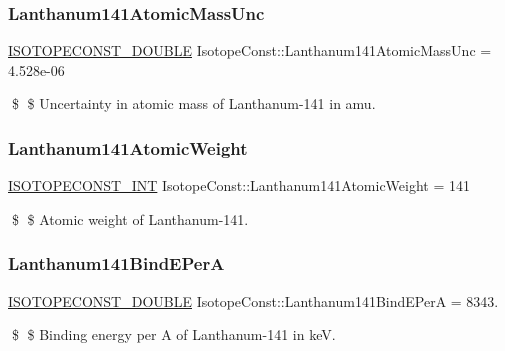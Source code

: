 \subsubsection{\texorpdfstring{Lanthanum141\+Atomic\+Mass\+Unc}{Lanthanum141AtomicMassUnc}}
{\footnotesize\ttfamily \mbox{\hyperlink{group___isotope_const-_macros_ga8f45a7272ce02c0b4c65c44636ed719a}{I\+S\+O\+T\+O\+P\+E\+C\+O\+N\+S\+T\+\_\+\+D\+O\+U\+B\+LE}} Isotope\+Const\+::\+Lanthanum141\+Atomic\+Mass\+Unc = 4.\+528e-\/06}

\$ \$ Uncertainty in atomic mass of Lanthanum-\/141 in amu. \mbox{\label{group___isotope_const-_lanthanum-_la141_ga2aeb91ddd4220ae60cf8d4d124f5775e}} 
\subsubsection{\texorpdfstring{Lanthanum141\+Atomic\+Weight}{Lanthanum141AtomicWeight}}
{\footnotesize\ttfamily \mbox{\hyperlink{group___isotope_const-_macros_ga5f18360b3e99483a35c32d789e62621c}{I\+S\+O\+T\+O\+P\+E\+C\+O\+N\+S\+T\+\_\+\+I\+NT}} Isotope\+Const\+::\+Lanthanum141\+Atomic\+Weight = 141}

\$ \$ Atomic weight of Lanthanum-\/141. \mbox{\label{group___isotope_const-_lanthanum-_la141_ga31fe386860943d001b45892e5d6d67d2}} 
\subsubsection{\texorpdfstring{Lanthanum141\+Bind\+E\+PerA}{Lanthanum141BindEPerA}}
{\footnotesize\ttfamily \mbox{\hyperlink{group___isotope_const-_macros_ga8f45a7272ce02c0b4c65c44636ed719a}{I\+S\+O\+T\+O\+P\+E\+C\+O\+N\+S\+T\+\_\+\+D\+O\+U\+B\+LE}} Isotope\+Const\+::\+Lanthanum141\+Bind\+E\+PerA = 8343.}

\$ \$ Binding energy per A of Lanthanum-\/141 in keV. \mbox{\label{group___isotope_const-_lanthanum-_la141_gaee664d4708e322cf15b2d33ac7f8f72b}} 
